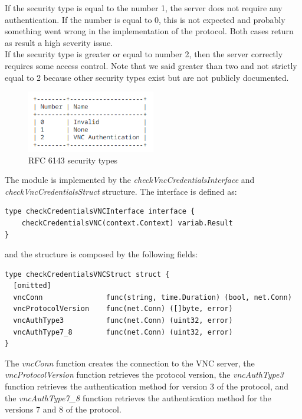 If the security type is equal to the number 1, the server does not require any authentication. If the number is equal to 0, this is not expected and probably something went wrong in the implementation of the protocol. Both cases return as result a high severity issue. \\
If the security type is greater or equal to number 2, then the server correctly requires some access control. Note that we said greater than two and not strictly equal to 2 because other security types exist but are not publicly documented.

\begin{figure}[h]
  \centering
  \includegraphics[width=0.5\textwidth]{chapters/05/assets/rfc6143-security-types}
  \caption{RFC 6143 security types}
  \label{fig:rfc6143-security-types}
\end{figure}

The module is implemented by the \textit{checkVncCredentialsInterface} and \textit{checkVncCredentialsStruct} structure. The interface is defined as:

\begin{lstlisting}[style=golang]
type checkCredentialsVNCInterface interface {
	checkCredentialsVNC(context.Context) variab.Result
}
\end{lstlisting}

and the structure is composed by the following fields:

\begin{lstlisting}[style=golang]
type checkCredentialsVNCStruct struct {
  [omitted]
  vncConn               func(string, time.Duration) (bool, net.Conn)
  vncProtocolVersion    func(net.Conn) ([]byte, error)
  vncAuthType3          func(net.Conn) (uint32, error)
  vncAuthType7_8        func(net.Conn) (uint32, error)
}
\end{lstlisting}

The \textit{vncConn} function creates the connection to the VNC server, the \textit{vncProtocolVersion} function retrieves the protocol version, the \textit{vncAuthType3} function retrieves the authentication method for version 3 of the protocol, and the \textit{vncAuthType7\_8} function retrieves the authentication method for the versions 7 and 8 of the protocol.

